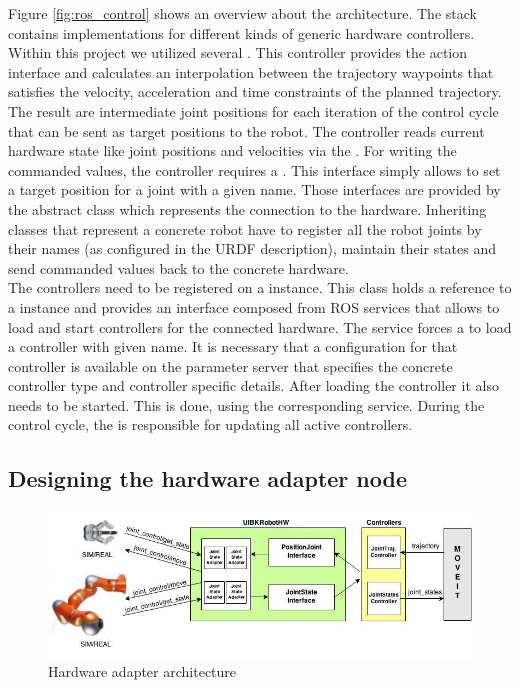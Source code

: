 Figure \ref{fig:ros_control} shows an overview about the  architecture. The  stack contains implementations for different kinds of generic hardware controllers. Within this project we utilized several . This controller provides the  action interface and calculates an interpolation between the trajectory waypoints that satisfies the velocity, acceleration and time constraints of the planned trajectory. The result are intermediate joint positions for each iteration of the control cycle that can be sent as target positions to the robot. The controller reads current hardware state like joint positions and velocities via the . For writing the commanded values, the controller requires a . This interface simply allows to set a target position for a joint with a given name. Those interfaces are provided by the abstract  class which represents the connection to the hardware. Inheriting classes that represent a concrete robot have to register all the robot joints by their names (as configured in the URDF description), maintain their states and send commanded values back to the concrete hardware. \\

The controllers need to be registered on a  instance. This class holds a reference to a  instance and provides an interface composed from ROS services that allows to load and start controllers for the connected hardware. The  service forces a  to load a controller with given name. It is necessary that a configuration for that controller is available on the parameter server that specifies the concrete controller type and controller specific details. After loading the controller it also needs to be started. This is done, using the corresponding  service. During the control cycle, the  is responsible for updating all active controllers. \\

\subsection{Designing the hardware adapter node}

\begin{figure}[h]
	\centering
  	\includegraphics[width=1.0\textwidth]{images/hardware_adapter.jpg}
	\caption{Hardware adapter architecture}
	\label{fig:hardware_adapter}
\end{figure}


